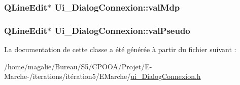 \hypertarget{class_ui___dialog_connexion_ae59151879eebdd101eaae39a532cdff8}{
\subsubsection[{val\-Mdp}]{\setlength{\rightskip}{0pt plus 5cm}Q\-Line\-Edit$\ast$ Ui\-\_\-\-Dialog\-Connexion\-::val\-Mdp}}\label{class_ui___dialog_connexion_ae59151879eebdd101eaae39a532cdff8}
\hypertarget{class_ui___dialog_connexion_a4560ad500c66e02c38d52f01b71c5c8b}{
\subsubsection[{val\-Pseudo}]{\setlength{\rightskip}{0pt plus 5cm}Q\-Line\-Edit$\ast$ Ui\-\_\-\-Dialog\-Connexion\-::val\-Pseudo}}\label{class_ui___dialog_connexion_a4560ad500c66e02c38d52f01b71c5c8b}


La documentation de cette classe a été générée à partir du fichier suivant \-:\begin{DoxyCompactItemize}
\item 
/home/magalie/\-Bureau/\-S5/\-C\-P\-O\-O\-A/\-Projet/\-E-\/\-Marche-\//iterations/itération5/\-E\-Marche/\hyperlink{ui___dialog_connexion_8h}{ui\-\_\-\-Dialog\-Connexion.\-h}\end{DoxyCompactItemize}
